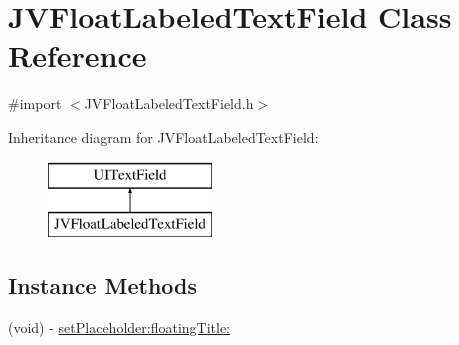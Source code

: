 \hypertarget{interface_j_v_float_labeled_text_field}{}\section{J\+V\+Float\+Labeled\+Text\+Field Class Reference}
\label{interface_j_v_float_labeled_text_field}


{\ttfamily \#import $<$J\+V\+Float\+Labeled\+Text\+Field.\+h$>$}

Inheritance diagram for J\+V\+Float\+Labeled\+Text\+Field\+:\begin{figure}[H]
\begin{center}
\leavevmode
\includegraphics[height=2.000000cm]{interface_j_v_float_labeled_text_field}
\end{center}
\end{figure}
\subsection*{Instance Methods}
\begin{DoxyCompactItemize}
\item 
(void) -\/ \hyperlink{interface_j_v_float_labeled_text_field_a195fa78fcd5fcc7c648ef544d90c6f16}{set\+Placeholder\+:floating\+Title\+:}
\end{DoxyCompactItemize}
